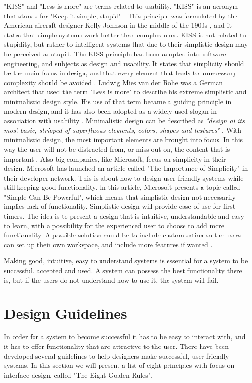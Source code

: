 "KISS" and "Less is more" are terms related to usability. "KISS" is an acronym that stands for "Keep it simple, stupid" \cite{kiss2}. This principle was formulated by the American aircraft designer Kelly Johnson in the middle of the 1900s \cite{kiss1}, and it states that simple systems work better than complex ones. KISS is not related to stupidity, but rather to intelligent systems that due to their simplistic design may be perceived as stupid. The KISS principle has been adopted into software engineering, and subjects as design and usability. It states that simplicity should be the main focus in design, and that every element that leads to unnecessary complexity should be avoided \cite{kiss2}. Ludwig Mies van der Rohe was a German architect that used the term "Less is more" to describe his extreme simplistic and minimalistic design style. His use of that term became a guiding principle in modern design, and it has also been adopted as a widely used slogan in association with usability \cite{rohe}. Minimalistic design can be described as \emph{"design at its most basic, stripped of superfluous elements, colors, shapes and textures"} \cite{lessismore}. With minimalistic design, the most important elements are brought into focus. In this way the user will not be distracted from, or miss out on, the content that is important \cite{lessismore}. Also big companies, like Microsoft, focus on simplicity in their design. Microsoft has launched an article called "The Importance of Simplicity" in their developer network. This is about how to design user-friendly systems while still keeping good functionality. In this article, Microsoft presents a topic called "Simple Can Be Powerful", which means that simplistic design not necessarily implies lack of functionality. Simplistic design will provide ease of use for first timers. The idea is to present a design that is intuitive, understandable and easy to learn, with a possibility for the experienced user to choose to add more functionality. A possible solution could be to include customisation so the users can set up their own workspace, and include more features if wanted \cite{msdnsimple}.      

Making good, intuitive, easy to understand systems is essential for a system to be successful, accepted and used. A system can possess the best functionality there is, but if the users do not understand how to use it, the system will fail.      
    
\section{Design Guidelines}
\label{sec:designguide}
In order for a system to become successful it has to be easy to interact with, and it has to offer functionality that are attractive to the user. There have been developed several guidelines to help designers make successful, user-friendly systems. In this section we will present a list of eight principles with focus on interface design, called "The Eight Golden Rules". 

